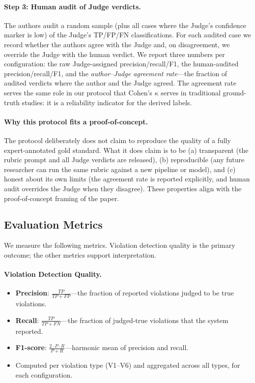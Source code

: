 \documentclass[smallextended]{svjour3}
\begin{document}
\paragraph{Step 3: Human audit of Judge verdicts.}
The authors audit a random sample (plus all cases where the Judge's confidence marker is low) of the Judge's TP/FP/FN classifications.
For each audited case we record whether the authors agree with the Judge and, on disagreement, we override the Judge with the human verdict.
We report three numbers per configuration: the raw Judge-assigned precision/recall/F1, the human-audited precision/recall/F1, and the \emph{author--Judge agreement rate}---the fraction of audited verdicts where the author and the Judge agreed.
The agreement rate serves the same role in our protocol that Cohen's $\kappa$ serves in traditional ground-truth studies: it is a reliability indicator for the derived labels.

\paragraph{Why this protocol fits a proof-of-concept.}
The protocol deliberately does not claim to reproduce the quality of a fully expert-annotated gold standard.
What it does claim is to be (a) transparent (the rubric prompt and all Judge verdicts are released), (b) reproducible (any future researcher can run the same rubric against a new pipeline or model), and (c) honest about its own limits (the agreement rate is reported explicitly, and human audit overrides the Judge when they disagree).
These properties align with the proof-of-concept framing of the paper.

\subsection{Evaluation Metrics}
\label{sec:exp_metrics}

We measure the following metrics.
Violation detection quality is the primary outcome; the other metrics support interpretation.

\paragraph{Violation Detection Quality.}
\begin{itemize}
    \item \textbf{Precision}: $\frac{TP}{TP + FP}$---the fraction of reported violations judged to be true violations.
    \item \textbf{Recall}: $\frac{TP}{TP + FN}$---the fraction of judged-true violations that the system reported.
    \item \textbf{F1-score}: $\frac{2 \cdot P \cdot R}{P + R}$---harmonic mean of precision and recall.
    \item Computed per violation type (V1--V6) and aggregated across all types, for each configuration.
\end{itemize}
\end{document}

